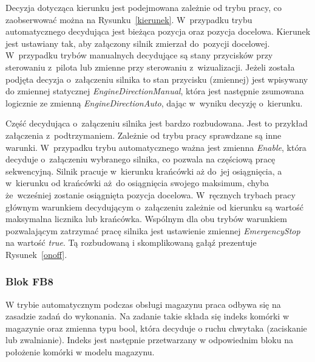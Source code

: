 Decyzja dotycząca kierunku jest podejmowana zależnie od trybu pracy, co zaobserwować można na Rysunku~\ref{kierunek}. W~przypadku trybu automatycznego decydująca jest bieżąca pozycja oraz pozycja docelowa. Kierunek jest ustawiany tak, aby załączony silnik zmierzał do~pozycji docelowej. W~przypadku trybów manualnych decydujące są stany przycisków przy sterowaniu z~pilota lub zmienne przy sterowaniu z~wizualizacji. Jeżeli została podjęta decyzja o~załączeniu silnika to stan przycisku (zmiennej) jest wpisywany do zmiennej statycznej \emph{EngineDirectionManual}, która jest następnie zsumowana logicznie ze zmienną \emph{EngineDirectionAuto}, dając w~wyniku decyzję o~kierunku.

Część decydująca o~załączeniu silnika jest bardzo rozbudowana. Jest to przykład załączenia z~podtrzymaniem. Zależnie od trybu pracy sprawdzane są inne warunki. W~przypadku trybu automatycznego ważna jest zmienna \emph{Enable}, która decyduje o~załączeniu wybranego silnika, co pozwala na częściową pracę sekwencyjną. Silnik pracuje w~kierunku krańcówki aż do~jej osiągnięcia, a w~kierunku od krańcówki aż~do osiągnięcia swojego maksimum, chyba że~wcześniej zostanie osiągnięta pozycja docelowa. W~ręcznych trybach pracy głównym warunkiem decydującym o~załączeniu zależnie od kierunku są wartość maksymalna licznika lub krańcówka. Wspólnym dla obu trybów warunkiem pozwalającym zatrzymać pracę silnika jest ustawienie zmiennej \emph{EmergencyStop} na wartość \emph{true}. Tą rozbudowaną i skomplikowaną gałąź prezentuje Rysunek~\ref{onoff}.

\subsubsection{Blok FB8}
W trybie automatycznym podczas obsługi magazynu praca odbywa się na zasadzie zadań do wykonania. Na zadanie takie składa się indeks komórki w magazynie oraz zmienna typu bool, która decyduje o ruchu chwytaka (zaciskanie lub zwalnianie). Indeks jest następnie przetwarzany w odpowiednim bloku na położenie komórki w modelu magazynu. 

